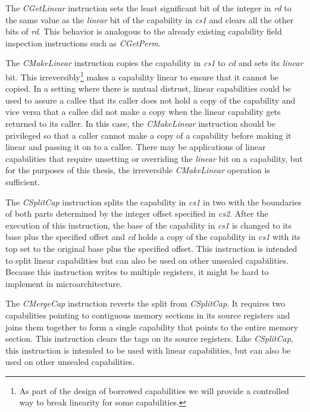 The \textit{CGetLinear} instruction sets the least significant bit of the integer in \textit{rd} to the same value as the \textit{linear} bit of the capability in \textit{cs1} and clears all the other bits of \textit{rd}. This behavior is analogous to the already existing capability field inspection instructions such as \textit{CGetPerm}.

The \textit{CMakeLinear} instruction copies the capability in \textit{cs1} to \textit{cd} and sets its \textit{linear} bit. This irreversibly\footnote{As part of the design of borrowed capabilities we will provide a controlled way to break linearity for some capabilities.} makes a capability linear to ensure that it cannot be copied.
In a setting where there is mutual distrust, linear capabilities could be used to assure a callee that its caller does not hold a copy of the capability and vice versa that a callee did not make a copy when the linear capability gets returned to its caller.
In this case, the \textit{CMakeLinear} instruction should be privileged so that a caller cannot make a copy of a capability before making it linear and passing it on to a callee.
There may be applications of linear capabilities that require unsetting or overriding the \textit{linear} bit on a capability, but for the purposes of this thesis, the irreversible \textit{CMakeLinear} operation is sufficient.

The \textit{CSplitCap} instruction splits the capability in \textit{cs1} in two with the boundaries of both parts determined by the integer offset specified in \textit{cs2}.
After the execution of this instruction, the base of the capability in \textit{cs1} is changed to its base plus the specified offset and \textit{cd} holds a copy of the capability in \textit{cs1} with its top set to the original base plus the specified offset. This instruction is intended to split linear capabilities but can also be used on other unsealed capabilities. Because this instruction writes to multiple registers, it might be hard to implement in microarchitecture.

The \textit{CMergeCap} instruction reverts the split from \textit{CSplitCap}. It requires two capabilities pointing to contiguous memory sections in its source registers and joins them together to form a single capability that points to the entire memory section. This instruction clears the tags on its source registers. Like \textit{CSplitCap}, this instruction is intended to be used with linear capabilities, but can also be used on other unsealed capabilities.

